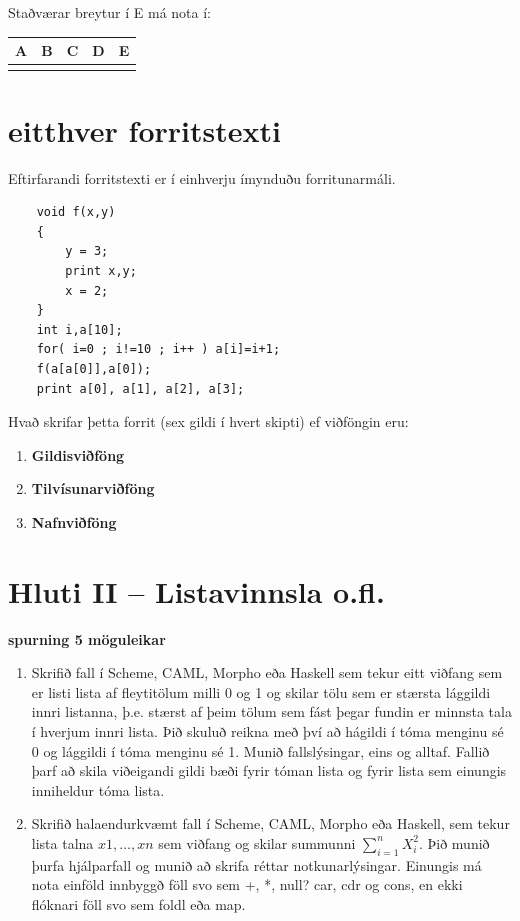 \documentclass{article}
\newcommand{\bo}[1]{\textbf{#1}}
\newcommand{\enum}{\begin{enumerate}[label = \alph*.]}
\begin{document}
\vspace{1cm}

Staðværar breytur í E má nota í:


\begin{tabularx}{\textwidth}{|X|X|X|X|X|}
    \hline
    \bo{A} & \bo{B} & \bo{C} & \bo{D} & \bo{E}\\ \hline
    & & & & \\ \hline
\end{tabularx}


\newpage
\section{eitthver forritstexti}
Eftirfarandi forritstexti er í einhverju ímynduðu forritunarmáli.

\begin{verbatim}
    void f(x,y)
    {
        y = 3;
        print x,y;
        x = 2;
    }
    int i,a[10];
    for( i=0 ; i!=10 ; i++ ) a[i]=i+1;
    f(a[a[0]],a[0]);
    print a[0], a[1], a[2], a[3];
\end{verbatim}
Hvað skrifar þetta forrit (sex gildi í hvert skipti) ef viðföngin eru:

\enum
\item \bo{Gildisviðföng }
\item \bo{Tilvísunarviðföng }
\item \bo{Nafnviðföng}
\end{enumerate}

\newpage
\section{Hluti II – Listavinnsla o.fl.}

\bo{spurning 5 möguleikar}
\begin{enumerate}
    \item Skrifið fall í Scheme, CAML, Morpho eða Haskell sem tekur eitt
    viðfang sem er listi lista af fleytitölum milli 0 og 1 og skilar tölu
    sem er stærsta lággildi innri listanna, þ.e. stærst af þeim tölum
    sem fást þegar fundin er minnsta tala í hverjum innri lista. Þið
    skuluð reikna með því að hágildi í tóma menginu sé 0 og lággildi
    í tóma menginu sé 1. Munið fallslýsingar, eins og alltaf. Fallið
    þarf að skila viðeigandi gildi bæði fyrir tóman lista og fyrir lista
    sem einungis inniheldur tóma lista.

    \item Skrifið halaendurkvæmt fall í Scheme, CAML, Morpho eða Haskell,
    sem tekur lista talna $x1, \ldots , xn$ sem viðfang og skilar summunni
    $\sum_{i=1}^{n}X_i^2$. Þið munið þurfa hjálparfall og munið að skrifa réttar
    notkunarlýsingar. Einungis má nota einföld innbyggð föll svo sem
    +, *, null? car, cdr og cons, en ekki flóknari föll svo sem foldl eða
    map.

\end{enumerate}
\end{document}
